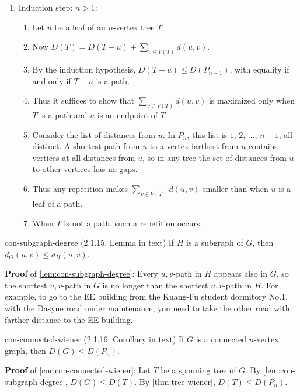 \documentclass[../src/handouts/main.tex]{subfiles}
\begin{document}
\begin{enumerate}
\begin{enumerate}
      \item Induction step: $n > 1$:
        \begin{enumerate}
          \item Let $u$ be a leaf of an $n$-vertex tree $T$.
          \item Now $D(T) = D(T - u) + \sum_{v \in V(T)} d(u, v)$.
          \item By the induction hypothesis, $D(T - u) \leq D(P_{n - 1})$, with equality if and only if $T - u$ is a path.
          \item Thus it suffices to show that $\sum_{v \in V(T)} d(u, v)$ is maximized only when $T$ is a path and $u$ is an endpoint of $T$.
          \item Consider the list of distances from $u$. In $P_n$, this list is $1,\, 2,\, \ldots,\, n - 1$, all distinct. A shortest path from $u$ to a vertex farthest from $u$ contains vertices at all distances from $u$, so in any tree the set of distances from $u$ to other vertices has no gaps.
          \item Thus any repetition makes $\sum_{v \in V(T)} d(u, v)$ smaller than when $u$ is a leaf of a path.
          \item When $T$ is not a path, such a repetition occurs.
        \end{enumerate}
    \end{enumerate}
\end{enumerate}

\begin{lemma}{}{con-subgraph-degree}
  (2.1.15. Lemma in text)
  If $H$ is a subgraph of $G$, then $d_G(u, v) \leq d_H(u, v)$.
\end{lemma}

\textbf{Proof} of \cref{lem:con-subgraph-degree}: Every $u, v$-path in $H$ appears also in $G$, so the shortest $u, v$-path in $G$ is no longer than the shortest $u, v$-path in $H$. For example, to go to the EE building from the Kuang-Fu student dormitory No.1, with the Dasyue road under maintenance, you need to take the other road with farther distance to the EE building.

\begin{corollary}{}{con-connected-wiener}
  (2.1.16. Corollary in text)
  If $G$ is a connected $n$-vertex graph, then $D(G) \leq D\left(P_n\right)$.
\end{corollary}

\textbf{Proof} of \cref{cor:con-connected-wiener}: Let $T$ be a spanning tree of $G$. By \cref{lem:con-subgraph-degree}, $D(G) \leq D(T)$. By \cref{thm:tree-wiener}, $D(T) \leq D\left(P_n\right)$.
\end{document}
